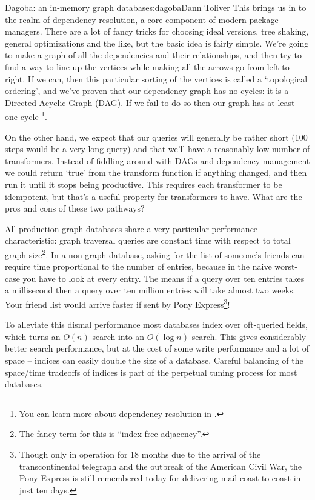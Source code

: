 \begin{aosachapter}{Dagoba: an in-memory graph database}{s:dagoba}{Dann Toliver}
This brings us in to the realm of dependency resolution, a core
component of modern package managers. There are a lot of fancy tricks
for choosing ideal versions, tree shaking, general optimizations and the
like, but the basic idea is fairly simple. We're going to make a graph
of all the dependencies and their relationships, and then try to find a
way to line up the vertices while making all the arrows go from left to
right. If we can, then this particular sorting of the vertices is called
a `topological ordering', and we've proven that our dependency graph has
no cycles: it is a Directed Acyclic Graph (DAG). If we fail to do so
then our graph has at least one cycle \footnote{You can learn more about
  dependency resolution in .}.

On the other hand, we expect that our queries will generally be rather
short (100 steps would be a very long query) and that we'll have a
reasonably low number of transformers. Instead of fiddling around with
DAGs and dependency management we could return `true' from the transform
function if anything changed, and then run it until it stops being
productive. This requires each transformer to be idempotent, but that's
a useful property for transformers to have. What are the pros and cons
of these two pathways?

\label{performance}

All production graph databases share a very particular performance
characteristic: graph traversal queries are constant time with respect
to total graph size\footnote{The fancy term for this is ``index-free
  adjacency''.}. In a non-graph database, asking for the list of
someone's friends can require time proportional to the number of
entries, because in the naive worst-case you have to look at every
entry. The means if a query over ten entries takes a millisecond then a
query over ten million entries will take almost two weeks. Your friend
list would arrive faster if sent by Pony Express\footnote{Though only in
  operation for 18 months due to the arrival of the transcontinental
  telegraph and the outbreak of the American Civil War, the Pony Express
  is still remembered today for delivering mail coast to coast in just
  ten days.}!

To alleviate this dismal performance most databases index over
oft-queried fields, which turns an $O(n)$ search into an $O(\log{}n)$
search. This gives considerably better search performance, but at the
cost of some write performance and a lot of space -- indices can easily
double the size of a database. Careful balancing of the space/time
tradeoffs of indices is part of the perpetual tuning process for most
databases.


\end{aosachapter}

